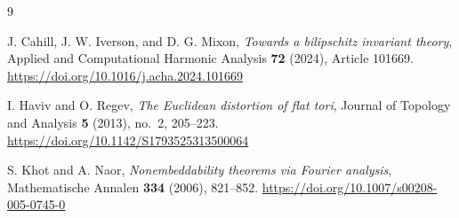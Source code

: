 \begin{thebibliography}{9}

J. Cahill, J. W. Iverson, and D. G. Mixon,
\emph{Towards a bilipschitz invariant theory},
Applied and Computational Harmonic Analysis \textbf{72} (2024), Article 101669.
\newblock \url{https://doi.org/10.1016/j.acha.2024.101669}

I. Haviv and O. Regev,
\emph{The Euclidean distortion of flat tori},
Journal of Topology and Analysis \textbf{5} (2013), no.~2, 205--223.
\newblock \url{https://doi.org/10.1142/S1793525313500064}

S. Khot and A. Naor,
\emph{Nonembeddability theorems via Fourier analysis},
Mathematische Annalen \textbf{334} (2006), 821--852.
\newblock \url{https://doi.org/10.1007/s00208-005-0745-0}

\end{thebibliography}